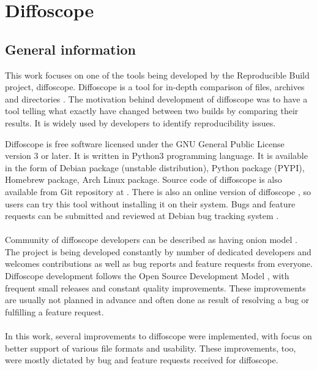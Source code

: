 \section{Diffoscope}

\subsection[General information]{General information}
This work focuses on one of the tools being developed by the
Reproducible Build project, diffoscope.
Diffoscope is a tool for in-depth comparison of files, archives and
directories \autocite{dfs}.
The motivation behind development of diffoscope was to have a tool
telling what exactly have changed between two builds by comparing
their results. It is widely used by developers to identify reproducibility issues.

Diffoscope is free software licensed under the GNU General Public
License version 3 or later. It is written in Python3 programming language.
It is available in the form of Debian package (unstable distribution),
Python package (PYPI), Homebrew package, Arch Linux package. Source code
of diffoscope is also available from Git repository at \autocite{dfs-git}.
There is also an online version of diffoscope \autocite{try-dfs}, so users
can try this tool without installing it on their system.
Bugs and feature requests can be submitted and reviewed at Debian
bug tracking system \autocite{dfs-bugs}.\\\\
Community of diffoscope developers can be described as having
onion model \autocite{aberdour2007achieving}.
The project is being developed constantly by number of dedicated
developers and welcomes contributions as well as bug reports
and feature requests from everyone.
Diffoscope development follows the Open Source Development Model
\autocite{osdm}, with frequent small releases and constant quality improvements.
These improvements are usually not planned in advance and often
done as result of resolving a bug or fulfilling a feature request.\\\\
In this work, several improvements to diffoscope were implemented,
with focus on better support of various file formats and usability.
These improvements, too, were mostly dictated by bug and feature requests
received for diffoscope.

